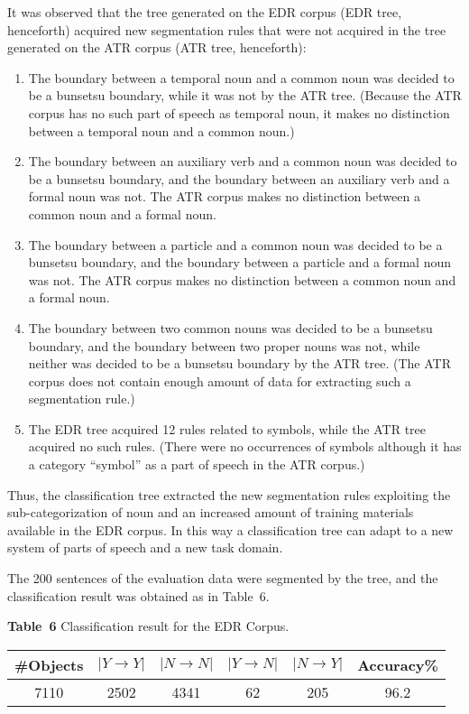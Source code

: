 It was observed that the tree generated on the 
EDR corpus (EDR tree, henceforth)
 acquired new segmentation rules that were not acquired in
the tree generated on the ATR corpus (ATR tree, henceforth):
\begin{enumerate}
\item The boundary between a temporal noun and a common noun
was decided to be a bunsetsu boundary, while it was not by the ATR tree. 
(Because the ATR corpus has no such part of speech
as temporal noun, it makes no
distinction between a temporal noun and a common noun.)
\item The boundary between an auxiliary verb and a common noun was
decided to be a bunsetsu boundary, and  
the  boundary between an auxiliary verb and a formal noun was not.
The ATR corpus  makes no distinction between a common noun and a formal noun.
\item The boundary between a particle and a common noun was decided
to be a bunsetsu boundary, 
and   the boundary between a particle and a formal noun was
not. The ATR corpus  makes no distinction between 
a common noun and a formal noun.
\item The boundary between two common nouns was
decided to be a bunsetsu boundary, and the boundary
between two proper nouns was not, while neither was decided to be a 
bunsetsu boundary  by the ATR tree. 
(The ATR corpus does not contain enough amount of data
for extracting such a segmentation rule.)
\item The EDR tree acquired 12 rules related to symbols, while
the ATR tree acquired no such rules.
(There were  no occurrences
of symbols although it has a category  ``symbol''  as a part of speech 
in the ATR corpus.)
\end{enumerate}
Thus, the classification tree extracted the new segmentation rules
exploiting  the sub-categorization of noun and an increased amount of 
training materials  available in  the EDR corpus.
In this way
a classification tree can adapt to a new system of parts of speech
and a new task domain.

The 200 sentences of the evaluation data were segmented by the tree, 
and the classification  result was obtained as in  Table\ 6.
\vspace{10pt}
\begin{center}
\small
{\bf Table\ 6} Classification result  for the EDR Corpus.
\vspace{10pt}\\
\begin{tabular}{c|c|c|c|c|c}
\#Objects&$|Y\rightarrow Y|$&$|N\rightarrow N|$&$|Y\rightarrow N|$&
$|N\rightarrow Y|$&Accuracy\%\\ \hline
7110&2502&4341&62&205&96.2
\end{tabular}
\end{center}

